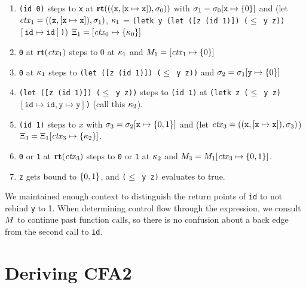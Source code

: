 \documentclass{llncs}
\begin{document}
\begin{enumerate}
\item{\texttt{(id 0)} steps to \texttt{x} at $\mathbf{rt}(((\texttt{x}, [\texttt{x}\mapsto\texttt{x}]), \sigma_0))$ with $\sigma_1 =
    \sigma_0[\texttt{x} \mapsto \{ 0 \}]$ and
    (let $\mathit{ctx}_1 = ((\texttt{x},[\texttt{x}\mapsto\texttt{x}]),\sigma_1)$,
         $\kappa_1$ = \texttt{(letk y (let ([z (id 1)]) ($\le$ y z)) $[\texttt{id}\mapsto{\texttt{id}}]$)})
    $\Xi_1 = [\mathit{ctx}_0 \mapsto \{ \kappa_0 \}]$}
\item{\texttt{0} at $\mathbf{rt}(\mathit{ctx}_1)$ steps to $0$ at $\kappa_1$ and $M_1 = [\mathit{ctx}_1 \mapsto \{ 0 \}]$}
\item{\texttt{0} at $\kappa_1$ steps to \texttt{(let ([z (id 1)]) ($\le$ y z))} and $\sigma_2 = \sigma_1[\texttt{y} \mapsto \{ 0 \}]$}
\item{\texttt{(let ([z (id 1)]) ($\le$ y z))} steps to \texttt{(id 1)} at \texttt{(letk z ($\le$ y z) $[\texttt{id} \mapsto \texttt{id}, \texttt{y} \mapsto \texttt{y}]$)} (call this $\kappa_2$).}
\item{\texttt{(id 1)} steps to $x$ with $\sigma_3 = \sigma_2[\texttt{x} \mapsto \{ 0,1 \}]$ and
      (let $\mathit{ctx}_3 = ((\texttt{x},[\texttt{x}\mapsto\texttt{x}]),\sigma_3)$) $\Xi_3 =\Xi_1[\mathit{ctx}_3 \mapsto \{ \kappa_2 \}]$.}
\item{\texttt{0} or \texttt{1} at $\mathbf{rt}(\mathit{ctx}_3)$ steps to \texttt{0} or \texttt{1} at $\kappa_2$ and $M_3 = M_1[\mathit{ctx}_3 \mapsto \{ 0,1 \}]$.}
\item{\texttt{z} gets bound to $\{ 0,1 \}$, and \texttt{($\le$ y z)} evaluates to true.}
\end{enumerate}

We maintained enough context to distinguish the return points of
\texttt{id} to not rebind \texttt{y} to 1. When determining control
flow through the expression, we consult $M$ to continue past
function calls, so there is no confusion about a back edge from the
second call to \texttt{id}.

\section{Deriving CFA2}
\label{sec:cfa2}
\end{document}
